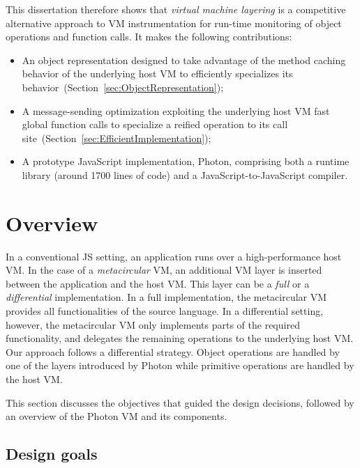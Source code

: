 This dissertation therefore shows that \emph{virtual machine layering} is a
competitive alternative approach to VM instrumentation for run-time monitoring
of object operations and function calls. It makes the following contributions:
\begin{itemize}
    \item An object representation designed to take advantage of the method
        caching behavior of the underlying host VM to efficiently specializes
        its behavior~(Section~\ref{sec:ObjectRepresentation});
    \item A message-sending optimization exploiting the underlying host VM fast
        global function calls to specialize a reified operation to its call
        site~(Section~\ref{sec:EfficientImplementation});
    \item A prototype JavaScript implementation, Photon, comprising both a runtime
        library (around 1700 lines of code) and a JavaScript-to-JavaScript compiler.
\end{itemize}

\section{Overview}

In a conventional JS setting, an application runs over a high-performance host
VM. In the case of a \emph{metacircular} VM, an additional VM layer is
inserted between the application and the host VM. This layer can be a
\emph{full} or a \emph{differential} implementation. In a full implementation,
the metacircular VM provides all functionalities of the source language. In a
differential setting, however, the metacircular VM only implements parts of
the required functionality, and delegates the remaining operations to the
underlying host VM. Our approach follows a differential strategy.
Object
 operations are handled by one of the layers introduced by
Photon while primitive operations are handled by the host VM.

This section discusses the objectives that guided the design decisions,
followed by an overview of the Photon VM and its components.

\subsection{Design goals}

